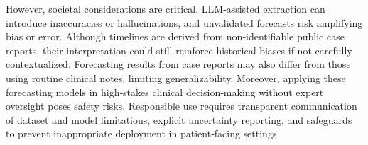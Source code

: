 However, societal considerations are critical. LLM‑assisted extraction can introduce inaccuracies or hallucinations, and unvalidated forecasts risk amplifying bias or error. Although timelines are derived from non‑identifiable public case reports, their interpretation could still reinforce historical biases if not carefully contextualized. Forecasting results from case reports may also differ from those using routine clinical notes, limiting generalizability. Moreover, applying these forecasting models in high‑stakes clinical decision‑making without expert oversight poses safety risks. Responsible use requires transparent communication of dataset and model limitations, explicit uncertainty reporting, and safeguards to prevent inappropriate deployment in patient‑facing settings.
